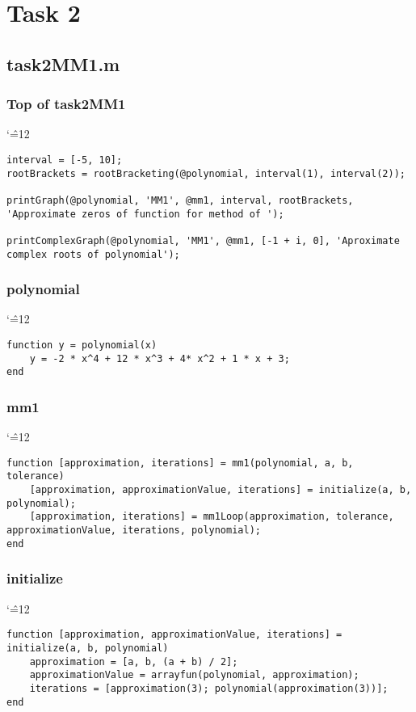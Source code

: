 \documentclass[12pt]{report}
\newenvironment{simplechar}{%
   \catcode`\^=12
}{}
\begin{document}
\newpage
\section{Task 2}

\subsection{task2MM1.m}

\subsubsection{Top of task2MM1}
\begin{simplechar}
\begin{lstlisting}
interval = [-5, 10];
rootBrackets = rootBracketing(@polynomial, interval(1), interval(2));

printGraph(@polynomial, 'MM1', @mm1, interval, rootBrackets, 'Approximate zeros of function for method of ');

printComplexGraph(@polynomial, 'MM1', @mm1, [-1 + i, 0], 'Aproximate complex roots of polynomial');
\end{lstlisting}
\end{simplechar}

\subsubsection{polynomial}
\begin{simplechar}
\begin{lstlisting}
function y = polynomial(x)
    y = -2 * x^4 + 12 * x^3 + 4* x^2 + 1 * x + 3;
end
\end{lstlisting}
\end{simplechar}

\subsubsection{mm1}
\begin{simplechar}
\begin{lstlisting}
function [approximation, iterations] = mm1(polynomial, a, b, tolerance)
    [approximation, approximationValue, iterations] = initialize(a, b, polynomial);
    [approximation, iterations] = mm1Loop(approximation, tolerance, approximationValue, iterations, polynomial);
end
\end{lstlisting}
\end{simplechar}

\newpage
\subsubsection{initialize}
\begin{simplechar}
\begin{lstlisting}
function [approximation, approximationValue, iterations] = initialize(a, b, polynomial)
    approximation = [a, b, (a + b) / 2];
    approximationValue = arrayfun(polynomial, approximation);
    iterations = [approximation(3); polynomial(approximation(3))];
end
\end{lstlisting}
\end{simplechar}
\end{document}

